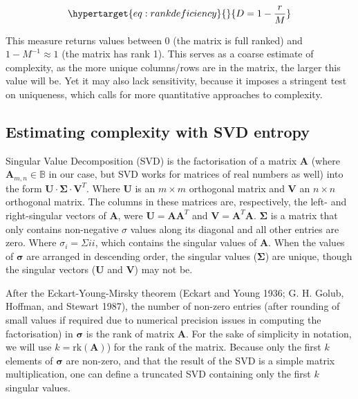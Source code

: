 \documentclass[11pt]{article}
\begin{document}
\begin{equation}\protect\hypertarget{eq:rankdeficiency}{}{D = 1-\frac{r}{M}}\label{eq:rankdeficiency}\end{equation}

This measure returns values between 0 (the matrix is full ranked) and
\(1-M^{-1} \approx 1\) (the matrix has rank 1). This serves as a coarse
estimate of complexity, as the more unique columns/rows are in the
matrix, the larger this value will be. Yet it may also lack sensitivity,
because it imposes a stringent test on uniqueness, which calls for more
quantitative approaches to complexity.

\hypertarget{estimating-complexity-with-svd-entropy}{%
\subsection{Estimating complexity with SVD
entropy}\label{estimating-complexity-with-svd-entropy}}

Singular Value Decomposition (SVD) is the factorisation of a matrix
\(\mathbf{A}\) (where \(\mathbf{A}_{m,n} \in\mathbb{B}\) in our case,
but SVD works for matrices of real numbers as well) into the form
\(\mathbf{U}\cdot\mathbf{\Sigma}\cdot \mathbf{V}^T\). Where
\(\mathbf{U}\) is an \(m \times m\) orthogonal matrix and \(\mathbf{V}\)
an \(n \times n\) orthogonal matrix. The columns in these matrices are,
respectively, the left- and right-singular vectors of \(\mathbf{A}\),
were \(\mathbf{U} = \mathbf{A}\mathbf{A}^T\) and
\(\mathbf{V} = \mathbf{A}^T\mathbf{A}\). \(\mathbf{\Sigma}\) is a matrix
that only contains non-negative \(\sigma\) values along its diagonal and
all other entries are zero. Where \(\sigma_{i} = \Sigma{ii}\), which
contains the singular values of \(\mathbf{A}\). When the values of
\(\mathbf{\sigma}\) are arranged in descending order, the singular
values (\(\mathbf{\Sigma}\)) are unique, though the singular vectors
(\(\mathbf{U}\) and \(\mathbf{V}\)) may not be.

After the Eckart-Young-Mirsky theorem (Eckart and Young 1936; G. H.
Golub, Hoffman, and Stewart 1987), the number of non-zero entries (after
rounding of small values if required due to numerical precision issues
in computing the factorisation) in \(\mathbf{\sigma}\) is the rank of
matrix \(\mathbf{A}\). For the sake of simplicity in notation, we will
use \(k = \text{rk}(\mathbf{A})\)) for the rank of the matrix. Because
only the first \(k\) elements of \(\mathbf{\sigma}\) are non-zero, and
that the result of the SVD is a simple matrix multiplication, one can
define a truncated SVD containing only the first \(k\) singular values.
\end{document}
